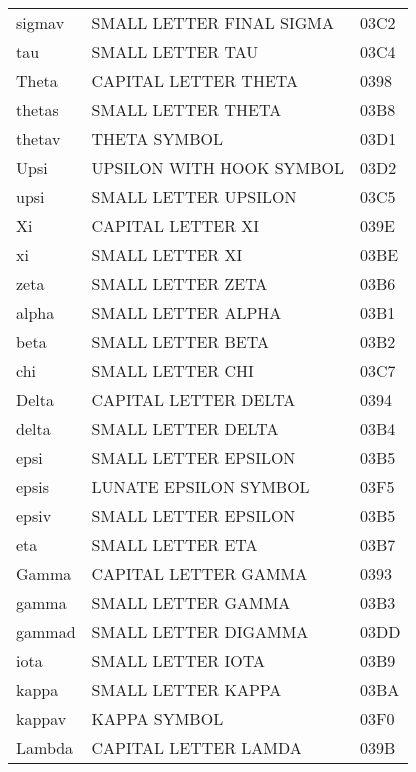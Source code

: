 \begin{longtable}{lll}
sigmav             &  SMALL LETTER FINAL SIGMA      & 03C2\\
tau                &  SMALL LETTER TAU              & 03C4\\
Theta              &  CAPITAL LETTER THETA          & 0398\\
thetas             &  SMALL LETTER THETA            & 03B8\\
thetav             &  THETA SYMBOL                  & 03D1\\
Upsi               &  UPSILON WITH HOOK SYMBOL      & 03D2\\
upsi               &  SMALL LETTER UPSILON          & 03C5\\
Xi                 &  CAPITAL LETTER XI             & 039E\\
xi                 &  SMALL LETTER XI               & 03BE\\
zeta               &  SMALL LETTER ZETA             & 03B6\\
%
%
%
alpha              &  SMALL LETTER ALPHA            & 03B1\\
beta               &  SMALL LETTER BETA             & 03B2\\
chi                &  SMALL LETTER CHI              & 03C7\\
Delta              &  CAPITAL LETTER DELTA          & 0394\\
delta              &  SMALL LETTER DELTA            & 03B4\\
epsi               &  SMALL LETTER EPSILON          & 03B5\\
epsis              &  LUNATE EPSILON SYMBOL         & 03F5\\
epsiv              &  SMALL LETTER EPSILON          & 03B5\\
eta                &  SMALL LETTER ETA              & 03B7\\
Gamma              &  CAPITAL LETTER GAMMA          & 0393\\
gamma              &  SMALL LETTER GAMMA            & 03B3\\
gammad             &  SMALL LETTER DIGAMMA          & 03DD\\
iota               &  SMALL LETTER IOTA             & 03B9\\
kappa              &  SMALL LETTER KAPPA            & 03BA\\
kappav             &  KAPPA SYMBOL                  & 03F0\\
Lambda             &  CAPITAL LETTER LAMDA          & 039B\\

\end{longtable}
